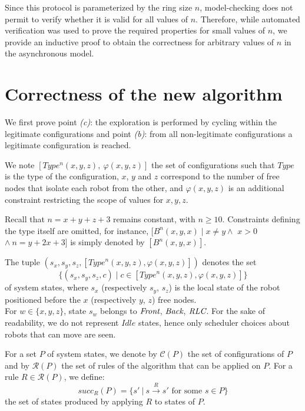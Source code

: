 	
Since this protocol is parameterized by the ring size $n$, 
model-checking does not permit to verify whether it is valid for all
values of $n$. Therefore, while automated verification was used to
prove the required properties for small values of $n$, we provide an
inductive proof to obtain the correctness for arbitrary values of $n$
in the asynchronous model.



	\section{Correctness of the new algorithm }
\label{subsec:induction}  

We first prove point \emph{(c)}: the exploration is performed
by cycling within the legitimate configurations and point \emph{(b)}:
from all non-legitimate configurations a legitimate configuration is
reached.

\begin{definition}
\label{note:type}
We note $[Type^n(x, y, z), \ \varphi(x, y, z)]$ the set of
configurations such that $Type$ is the type of the configuration, $x$, $y$ and $z$ correspond to the number of free
nodes that isolate each robot from the other, and $\varphi(x, y, z)$ is
an additional constraint restricting the scope of values for $x, y, z$.
\end{definition}
Recall that $n = x+y+z+3$ remains constant, with $n\geq
10$. Constraints defining the type itself are omitted, for instance, 
$[B^n(x, y, x) \mid x\neq y \wedge $ $x> 0$ $\wedge \ n = y+2x+3]$ is
simply denoted by $[B^n(x, y, x)]$.



\begin{definition}
\label{note:state}
The tuple $(s_x, s_y, s_z, [\textit{Type}^n(x, y, z), \varphi(x, y, z)])$ denotes
the set $$\{(s_x, s_y, s_z, c) \mid c \in [\textit{Type}^n(x, y, z), 
\varphi(x, y, z)] \}$$ of system states, where $s_x$ (respectively $s_y$, 
$s_z$) is the local state of the robot positioned before the
$x$ (respectively $y$, $z$) free nodes.\\
For $w \in \{x, y, z\}$, state $s_w$ belongs to $\textit{Front}$, $\textit{Back}$, 
$\textit{RLC}$. For the sake of readability, we do not
represent $\textit{Idle}$ states, hence only scheduler choices about robots
that can move are seen.

For a set $P$ of system states, we denote by $\mathcal{C}(P)$ the set
of configurations of $P$ and by $\mathcal{R}(P)$ the set of rules of
the algorithm that can be applied on $P$. For a rule $R \in
\mathcal{R}(P)$, we define: $$succ_{R}(P)=\{s' \ | \ s \xrightarrow{R}
s' \textrm{ for some } s \in P\}$$ the set of states produced by
applying $R$ to states of $P$.
\end{definition}

